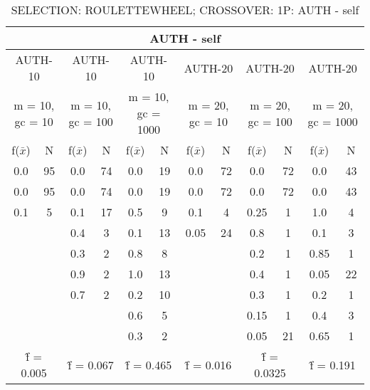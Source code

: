 \begin{table}[H]
	\centering
	\caption{SELECTION: ROULETTEWHEEL; CROSSOVER: 1P: AUTH - self}
	\begin{adjustbox}{width=1\textwidth}
		\begin{tabular}{ |c|c||c|c||c|c||c|c||c|c||c|c| }
			\hline
			\multicolumn{12}{|c|}{AUTH - self} \\
			\hline
			\multicolumn{2}{|c||}{AUTH-10} & \multicolumn{2}{c||}{AUTH-10} & \multicolumn{2}{c||}{AUTH-10} & \multicolumn{2}{c||}{AUTH-20} & \multicolumn{2}{c||}{AUTH-20} & \multicolumn{2}{c|}{AUTH-20}\\
			\hline
			\multicolumn{2}{|c||}{m = 10, gc = 10} & \multicolumn{2}{c||}{m = 10, gc = 100} & \multicolumn{2}{c||}{m = 10, gc = 1000} & \multicolumn{2}{c||}{m = 20, gc = 10} & \multicolumn{2}{c||}{m = 20, gc = 100} & \multicolumn{2}{c|}{m = 20, gc = 1000}\\
			\hline
			f($\bar{x}$) & N & f($\bar{x}$) & N & f($\bar{x}$) & N & f($\bar{x}$) & N & f($\bar{x}$) & N & f($\bar{x}$) & N\\
			\hline
			\hline
			0.0 & 95 & 0.0 & 74 & 0.0 & 19 & 0.0 & 72 & 0.0 & 72 & 0.0 & 43\\
			\hline
			0.0 & 95 & 0.0 & 74 & 0.0 & 19 & 0.0 & 72 & 0.0 & 72 & 0.0 & 43\\
			0.1 & 5 & 0.1 & 17 & 0.5 & 9 & 0.1 & 4 & 0.25 & 1 & 1.0 & 4\\
			&   & 0.4 & 3 & 0.1 & 13 & 0.05 & 24 & 0.8 & 1 & 0.1 & 3\\
			&   & 0.3 & 2 & 0.8 & 8 &   &   & 0.2 & 1 & 0.85 & 1\\
			&   & 0.9 & 2 & 1.0 & 13 &   &   & 0.4 & 1 & 0.05 & 22\\
			&   & 0.7 & 2 & 0.2 & 10 &   &   & 0.3 & 1 & 0.2 & 1\\
			&   &   &   & 0.6 & 5 &   &   & 0.15 & 1 & 0.4 & 3\\
			&   &   &   & 0.3 & 2 &   &   & 0.05 & 21 & 0.65 & 1\\
			\hline
			\multicolumn{2}{|c||}{\^{f} = 0.005} & \multicolumn{2}{c||}{\^{f} = 0.067} & \multicolumn{2}{c||}{\^{f} = 0.465} & \multicolumn{2}{c||}{\^{f} = 0.016} & \multicolumn{2}{c||}{\^{f} = 0.0325} & \multicolumn{2}{c|}{\^{f} = 0.191}\\
			\hline
		\end{tabular}
	\end{adjustbox}
\end{table}
